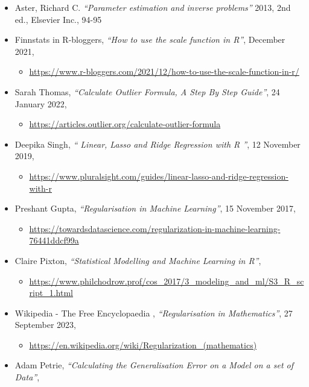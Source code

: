 \documentclass[
]{article}
\providecommand{\tightlist}{%
  \setlength{\itemsep}{0pt}\setlength{\parskip}{0pt}}
\begin{document}
\begin{itemize}
\item
  Aster, Richard C. \emph{``Parameter estimation and inverse problems''}
  2013, 2nd ed., Elsevier Inc., 94-95
\item
  Finnstats in R-bloggers, \emph{``How to use the scale function in
  R''}, December 2021,

  \begin{itemize}
  \tightlist
  \item
    \url{https://www.r-bloggers.com/2021/12/how-to-use-the-scale-function-in-r/}
  \end{itemize}
\item
  Sarah Thomas, \emph{``Calculate Outlier Formula, A Step By Step
  Guide''}, 24 January 2022,

  \begin{itemize}
  \tightlist
  \item
    \url{https://articles.outlier.org/calculate-outlier-formula}
  \end{itemize}
\item
  Deepika Singh, \emph{`` Linear, Lasso and Ridge Regression with R ''},
  12 November 2019,

  \begin{itemize}
  \tightlist
  \item
    \url{https://www.pluralsight.com/guides/linear-lasso-and-ridge-regression-with-r}
  \end{itemize}
\item
  Preshant Gupta, \emph{``Regularisation in Machine Learning''}, 15
  November 2017,

  \begin{itemize}
  \tightlist
  \item
    \url{https://towardsdatascience.com/regularization-in-machine-learning-76441ddcf99a}
  \end{itemize}
\item
  Claire Pixton, \emph{``Statistical Modelling and Machine Learning in
  R''},

  \begin{itemize}
  \tightlist
  \item
    \url{https://www.philchodrow.prof/cos_2017/3_modeling_and_ml/S3_R_script_1.html}
  \end{itemize}
\item
  Wikipedia - The Free Encyclopaedia , \emph{``Regularisation in
  Mathematics''}, 27 September 2023,

  \begin{itemize}
  \tightlist
  \item
    \url{https://en.wikipedia.org/wiki/Regularization_(mathematics)}
  \end{itemize}
\item
  Adam Petrie, \emph{``Calculating the Generalisation Error on a Model
  on a set of Data''},


\end{itemize}
\end{document}
